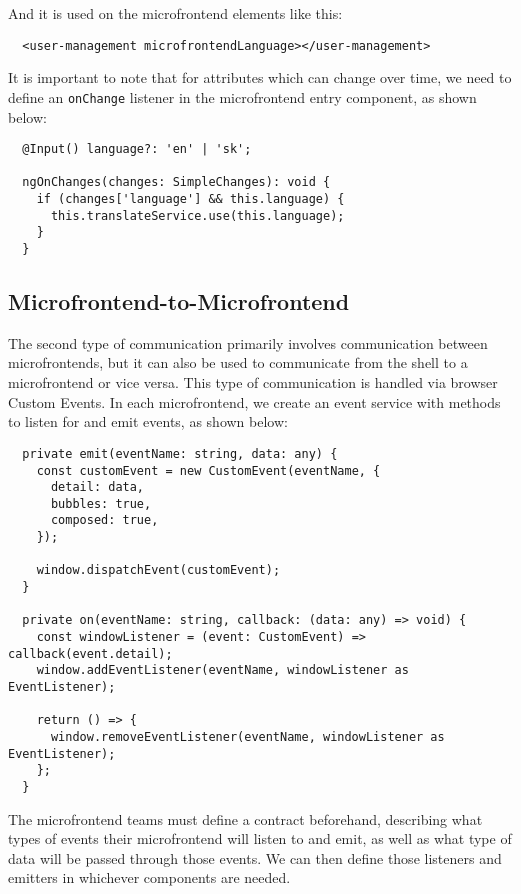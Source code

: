 And it is used on the microfrontend elements like this:
\begin{verbatim}
  <user-management microfrontendLanguage></user-management>
\end{verbatim}
It is important to note that for attributes which can change over time, we need to define an \texttt{onChange} listener in the microfrontend entry component, as shown below:
\begin{verbatim}
  @Input() language?: 'en' | 'sk';

  ngOnChanges(changes: SimpleChanges): void {
    if (changes['language'] && this.language) {
      this.translateService.use(this.language);
    }
  }
\end{verbatim}

\subsection*{Microfrontend-to-Microfrontend}
The second type of communication primarily involves communication between microfrontends, but it can also be used to communicate from the shell to a microfrontend or vice versa. This type of communication is handled via browser Custom Events. In each microfrontend, we create an event service with methods to listen for and emit events, as shown below:
\begin{verbatim}
  private emit(eventName: string, data: any) {
    const customEvent = new CustomEvent(eventName, {
      detail: data,
      bubbles: true,
      composed: true,
    });
  
    window.dispatchEvent(customEvent);
  }
  
  private on(eventName: string, callback: (data: any) => void) {
    const windowListener = (event: CustomEvent) => callback(event.detail);
    window.addEventListener(eventName, windowListener as EventListener);
  
    return () => {
      window.removeEventListener(eventName, windowListener as EventListener);
    };
  }
\end{verbatim}
The microfrontend teams must define a contract beforehand, describing what types of events their microfrontend will listen to and emit, as well as what type of data will be passed through those events. We can then define those listeners and emitters in whichever components are needed.